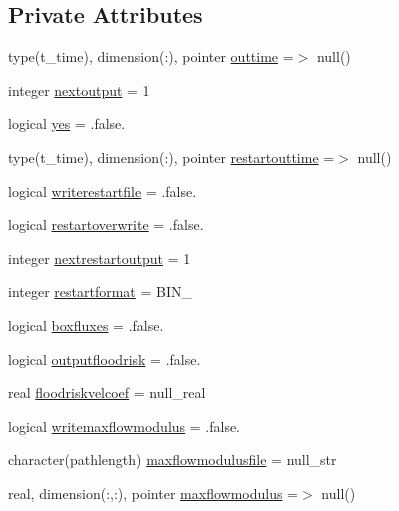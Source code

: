 \subsection*{Private Attributes}
\begin{DoxyCompactItemize}
\item 
type(t\+\_\+time), dimension(\+:), pointer \mbox{\hyperlink{structmodulerunoff_1_1t__output_a7104ac096f3e0125934ebd257736c8ea}{outtime}} =$>$ null()
\item 
integer \mbox{\hyperlink{structmodulerunoff_1_1t__output_a294d02030d733b39a8e9b79044ec9488}{nextoutput}} = 1
\item 
logical \mbox{\hyperlink{structmodulerunoff_1_1t__output_ad3aa3ea59a6f4ed7b4a8428986b1c946}{yes}} = .false.
\item 
type(t\+\_\+time), dimension(\+:), pointer \mbox{\hyperlink{structmodulerunoff_1_1t__output_af28304a11b9e309f10a160f641c41952}{restartouttime}} =$>$ null()
\item 
logical \mbox{\hyperlink{structmodulerunoff_1_1t__output_a50af3e1f3beb29e77ccd576047896f2c}{writerestartfile}} = .false.
\item 
logical \mbox{\hyperlink{structmodulerunoff_1_1t__output_adbf3e3736459fdac015888a19e23ebd6}{restartoverwrite}} = .false.
\item 
integer \mbox{\hyperlink{structmodulerunoff_1_1t__output_a2d5b200f192c269929e399d523c59369}{nextrestartoutput}} = 1
\item 
integer \mbox{\hyperlink{structmodulerunoff_1_1t__output_a85e9f537c528da0f0f09362feba1ef83}{restartformat}} = B\+I\+N\+\_\+
\item 
logical \mbox{\hyperlink{structmodulerunoff_1_1t__output_a524e219e846806137478ae23d1a8ebb6}{boxfluxes}} = .false.
\item 
logical \mbox{\hyperlink{structmodulerunoff_1_1t__output_aaf71962110b952062e80f51e260efd66}{outputfloodrisk}} = .false.
\item 
real \mbox{\hyperlink{structmodulerunoff_1_1t__output_a5882ea1ec935542fd9d0c9862a64d8ea}{floodriskvelcoef}} = null\+\_\+real
\item 
logical \mbox{\hyperlink{structmodulerunoff_1_1t__output_aa093fcac0d2ea8f1278390189c46c1ba}{writemaxflowmodulus}} = .false.
\item 
character(pathlength) \mbox{\hyperlink{structmodulerunoff_1_1t__output_abb49b726c53da122864eb44a4a19c503}{maxflowmodulusfile}} = null\+\_\+str
\item 
real, dimension(\+:,\+:), pointer \mbox{\hyperlink{structmodulerunoff_1_1t__output_a451c76c31c2bcd24b3cb4ad07931eecb}{maxflowmodulus}} =$>$ null()

\end{DoxyCompactItemize}

